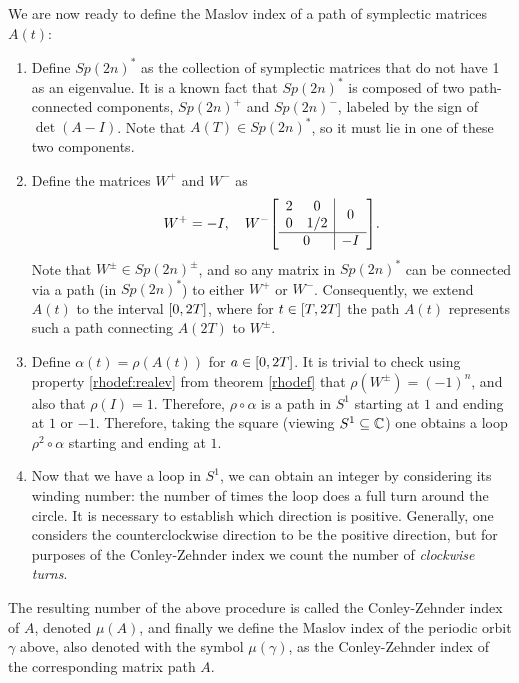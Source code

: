 We are now ready to define the Maslov index of a path of symplectic matrices $A(t)$:

\begin{enumerate}[algorithm]
\item Define $Sp(2n)^*$ as the collection of symplectic matrices that do not have 1 as an eigenvalue. It is a known fact \cite[proposition~7.1.4]{audin} that $Sp(2n)^*$ is composed of two path-connected components, $Sp(2n)^+$ and $Sp(2n)^-$, labeled by the sign of $\det(A-I)$. Note that $A(T) \in Sp(2n)^*$, so it must lie in one of these two components.
\item\label{maslov:step2} Define the matrices $W^+$ and $W^-$ as
\begin{equation}
W^+ = - I, \quad W^- \mleft[\begin{array}{c|c}
\begin{matrix} 2 & 0 \\ 0 & 1/2 \end{matrix} & 0\\
\hline
0 & -I
\end{array}\mright].
\end{equation}
Note that $W^\pm \in Sp(2n)^\pm$, and so any matrix in $Sp(2n)^*$ can be connected via a path (in $Sp(2n)^*$) to either $W^+$ or $W^-$. Consequently, we extend $A(t)$ to the interval $\interval 0 {2T}$, where for $t \in \interval T {2T}$ the path $A(t)$ represents such a path connecting $A(2T)$ to $W^\pm$.
\item Define $\alpha(t) = \rho(A(t))$ for $a \in \interval 0 {2T}$. It is trivial to check using property \ref{rhodef:realev} from theorem \ref{rhodef} that $\rho(W^\pm) = (-1)^n$, and also that $\rho(I) = 1$. Therefore, $\rho \circ \alpha$ is a path in $S^1$ starting at $1$ and ending at $1$ or $-1$. Therefore, taking the square (viewing $S^1 \subseteq \mathbb{C}$) one obtains a loop $\rho^2 \circ \alpha$ starting and ending at $1$.
\item Now that we have a loop in $S^1$, we can obtain an integer by considering its winding number: the number of times the loop does a full turn around the circle. It is necessary to establish which direction is positive. Generally, one considers the counterclockwise direction to be the positive direction, but for purposes of the Conley-Zehnder index we count the number of \emph{clockwise turns}.
\end{enumerate}
The resulting number of the above procedure is called the Conley-Zehnder index of $A$, denoted $\mu(A)$, and finally we define the Maslov index of the periodic orbit $\gamma$ above, also denoted with the symbol $\mu(\gamma)$, as the Conley-Zehnder index of the corresponding matrix path $A$.

